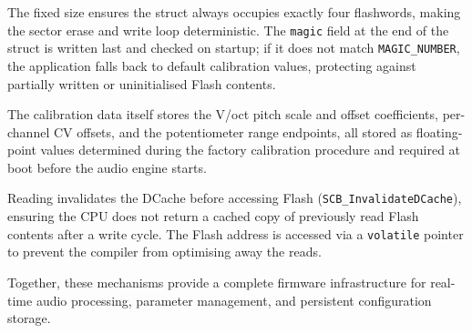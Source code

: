 The fixed size ensures the struct always occupies exactly four flashwords, making the 
sector erase and write loop deterministic. The \texttt{magic} field at the end of the 
struct is written last and checked on startup; if it does not match
\texttt{MAGIC\_NUMBER}, the application falls back to default calibration values,
protecting against partially written or uninitialised Flash contents.

The calibration data itself stores the V/oct pitch scale and offset coefficients, 
per-channel CV offsets, and the potentiometer range endpoints, all stored as floating-point
values determined during the factory calibration procedure and required at boot before
the audio engine starts.

Reading invalidates the DCache before accessing Flash
(\texttt{SCB\_InvalidateDCache}), ensuring the CPU does not return a cached copy of
previously read Flash contents after a write cycle. The Flash address is accessed via
a \texttt{volatile} pointer to prevent the compiler from optimising away the reads.

Together, these mechanisms provide a complete firmware infrastructure for real-time audio processing, parameter management, and persistent configuration storage.